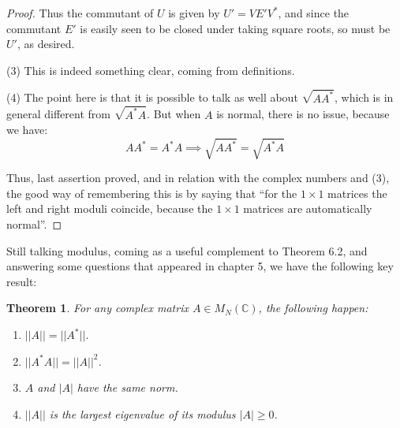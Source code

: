 \documentclass[12pt]{amsbook}
\newtheorem{theorem}{Theorem}[chapter]
\begin{document}
\begin{proof}
Thus the commutant of $U$ is given by $U'=VE'V^*$, and since the commutant $E'$ is easily seen to be closed under taking square roots, so must be $U'$, as desired.

\medskip

(3) This is indeed something clear, coming from definitions.

\medskip

(4) The point here is that it is possible to talk as well about $\sqrt{AA^*}$, which is in general different from $\sqrt{A^*A}$. But when $A$ is normal, there is no issue, because we have:
$$AA^*=A^*A\implies\sqrt{AA^*}=\sqrt{A^*A}$$

Thus, last assertion proved, and in relation with the complex numbers and (3), the good way of remembering this is by saying that ``for the $1\times1$ matrices the left and right moduli coincide, because the $1\times1$ matrices are automatically normal''.
\end{proof}

Still talking modulus, coming as a useful complement to Theorem 6.2, and answering some questions that appeared in chapter 5, we have the following key result:

\begin{theorem}
For any complex matrix $A\in M_N(\mathbb C)$, the following happen:
\begin{enumerate}
\item $||A||=||A^*||$.

\item $||A^*A||=||A||^2$.

\item $A$ and $|A|$ have the same norm.

\item $||A||$ is the largest eigenvalue of its modulus $|A|\geq0$.
\end{enumerate}
\end{theorem}
\end{document}

